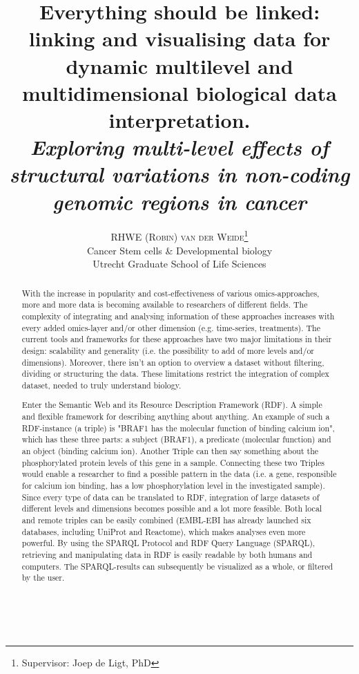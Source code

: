 \documentclass[twoside,fontsize=10pt]{article}
\title{\vspace{-15mm}\fontsize{18pt}{10pt}\normalfont\textbf{Everything should be linked: linking and visualising data for dynamic multilevel and multidimensional biological data interpretation.\\ \vspace{4 mm} {{\footnotesize \textit{Exploring multi-level effects of structural variations in non-coding genomic regions in cancer}}}}} %
\author{
\large
\textsc{RHWE (Robin) van der Weide}\thanks{Supervisor: Joep de Ligt, PhD}\\[2mm] %
\normalsize   Cancer Stem cells \& Developmental biology \\ %
\normalsize  Utrecht Graduate School of Life Sciences \\ %
\vspace{-5mm}
}
\date{}
\renewcommand{\abstractname}{}    %
\begin{document}
\maketitle %

\thispagestyle{fancy} %

\newpage
\mbox{   }
\newpage
\renewcommand{\abstractname}{\begin{center}
Summary of the research
\end{center}}    %
\begin{abstract}
\noindent With the increase in popularity and cost-effectiveness of various omics-approaches, more and more data is becoming available to researchers of different fields. The complexity of integrating and analysing information of these approaches increases with every added omics-layer and/or other dimension (e.g. time-series, treatments). The current tools and frameworks for these approaches have two major limitations in their design: scalability and generality (i.e. the possibility to add of more levels and/or dimensions). Moreover, there isn't an option to overview a dataset without filtering, dividing or structuring the data. These limitations restrict the integration of complex dataset, needed to truly understand biology.
\medskip

\noindent Enter the Semantic Web and its Resource Description Framework (RDF). A simple and flexible framework for describing anything about anything. An example of such a RDF-instance (a triple) is "BRAF1 has the molecular function of binding calcium ion", which has these three parts: a subject (BRAF1), a predicate (molecular function) and an object (binding calcium ion). Another Triple can then say something about the phosphorylated protein levels of this gene in a sample. Connecting these two Triples would enable a researcher to find a possible pattern in the data (i.e. a gene, responsible for calcium ion binding, has a low phosphorylation level in the investigated sample). Since every type of data can be translated to RDF, integration of large datasets of different levels and dimensions becomes possible and a lot more feasible. Both local and remote triples can be easily combined (EMBL-EBI has already launched six databases, including UniProt and Reactome), which makes analyses even more powerful. By using the SPARQL Protocol and RDF Query Language (SPARQL), retrieving and manipulating data in RDF is easily readable by both humans and computers. The SPARQL-results can subsequently be visualized as a whole, or filtered by the user. 
\medskip


\end{abstract}
\end{document}
